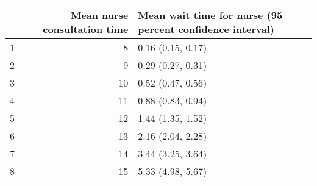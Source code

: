 \begin{table}[ht]
\centering
\begin{tabular}{rrl}
  \hline
 & Mean nurse consultation time & Mean wait time for nurse (95 percent confidence interval) \\ 
  \hline
1 &   8 & 0.16 (0.15, 0.17) \\ 
  2 &   9 & 0.29 (0.27, 0.31) \\ 
  3 &  10 & 0.52 (0.47, 0.56) \\ 
  4 &  11 & 0.88 (0.83, 0.94) \\ 
  5 &  12 & 1.44 (1.35, 1.52) \\ 
  6 &  13 & 2.16 (2.04, 2.28) \\ 
  7 &  14 & 3.44 (3.25, 3.64) \\ 
  8 &  15 & 5.33 (4.98, 5.67) \\ 
   \hline
\end{tabular}
\end{table}
